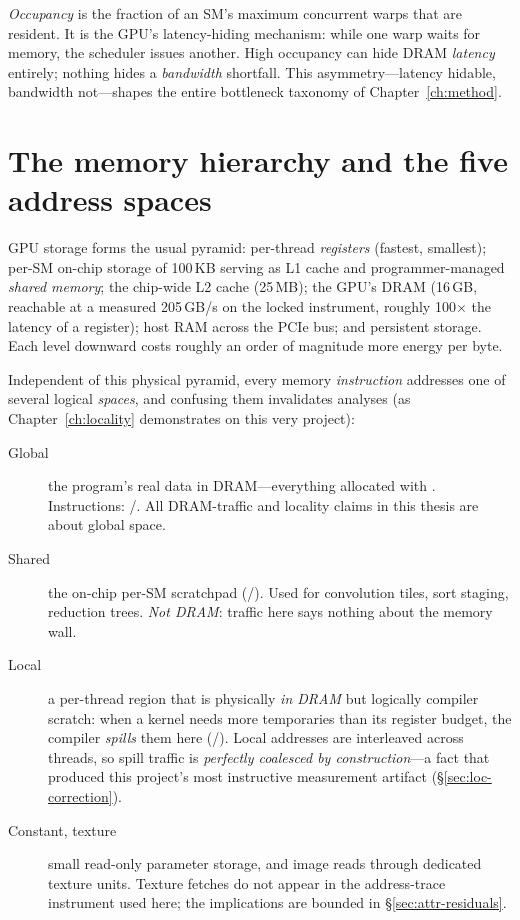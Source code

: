 \emph{Occupancy} is the fraction of an SM's maximum concurrent warps that are
resident. It is the GPU's latency-hiding mechanism: while one warp waits for
memory, the scheduler issues another. High occupancy can hide DRAM
\emph{latency} entirely; nothing hides a \emph{bandwidth} shortfall. This
asymmetry---latency hidable, bandwidth not---shapes the entire bottleneck
taxonomy of Chapter~\ref{ch:method}.

\section{The memory hierarchy and the five address spaces}
\label{sec:bg-mem}

GPU storage forms the usual pyramid: per-thread \emph{registers} (fastest,
smallest); per-SM on-chip storage of 100\,KB serving as L1 cache and
programmer-managed \emph{shared memory}; the chip-wide L2 cache (25\,MB); the
GPU's DRAM (16\,GB, reachable at a measured 205\,GB/s on the locked
instrument, roughly 100$\times$ the latency of a register); host RAM across
the PCIe bus; and persistent storage. Each level downward costs roughly an
order of magnitude more energy per byte.

Independent of this physical pyramid, every memory \emph{instruction}
addresses one of several logical \emph{spaces}, and confusing them invalidates
analyses (as Chapter~\ref{ch:locality} demonstrates on this very project):

\begin{description}
\item[Global] the program's real data in DRAM---everything allocated with
. Instructions: /. All DRAM-traffic and
locality claims in this thesis are about global space.
\item[Shared] the on-chip per-SM scratchpad (/). Used
for convolution tiles, sort staging, reduction trees. \emph{Not DRAM}:
traffic here says nothing about the memory wall.
\item[Local] a per-thread region that is physically \emph{in DRAM} but
logically compiler scratch: when a kernel needs more temporaries than its
register budget, the compiler \emph{spills} them here
(/). Local addresses are interleaved across threads, so
spill traffic is \emph{perfectly coalesced by construction}---a fact that
produced this project's most instructive measurement artifact
(\S\ref{sec:loc-correction}).
\item[Constant, texture] small read-only parameter storage, and image reads
through dedicated texture units. Texture fetches do not appear in the
address-trace instrument used here; the implications are bounded in
\S\ref{sec:attr-residuals}.
\end{description}

